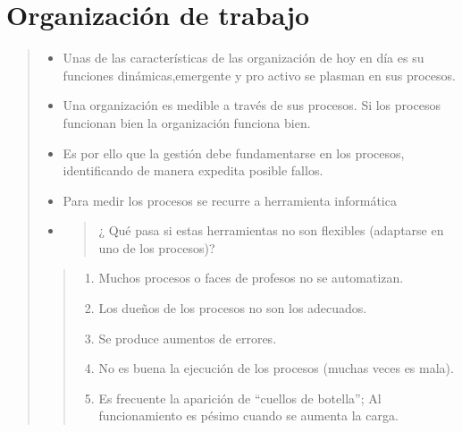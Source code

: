 \documentclass[letterpaper,11pt,spanish]{sphinxmanual}
\begin{document}
\chapter{Organización de trabajo}
\label{_templates/Contenido1/Introduccion:python}\label{_templates/Contenido1/Introduccion:organizacion-de-trabajo}\begin{quote}
\begin{itemize}
\item {} 
Unas de las características de las organización de hoy en día es su funciones dinámicas,emergente y pro activo se plasman en sus procesos.

\item {} 
Una organización es medible a través de sus procesos. Si los procesos funcionan bien la organización funciona bien.

\item {} 
Es por ello que la gestión debe fundamentarse en los procesos, identificando de manera expedita posible fallos.

\item {} 
Para medir los procesos se recurre a herramienta informática

\item {} \begin{quote}\begin{description}
\item[{¿ Qué pasa si estas herramientas no son flexibles (adaptarse en uno de los procesos)?}] \leavevmode
\end{description}\end{quote}

\end{itemize}
\begin{quote}
\begin{enumerate}
\item {} 
Muchos procesos o faces de profesos no se automatizan.

\item {} 
Los dueños de los procesos no son los adecuados.

\item {} 
Se produce aumentos de errores.

\item {} 
No es buena la ejecución de los procesos (muchas veces es mala).

\item {} 
Es frecuente la aparición de ``cuellos de botella'';  Al funcionamiento es pésimo cuando se aumenta la carga.


\end{enumerate}
\end{quote}
\end{quote}
\end{document}
